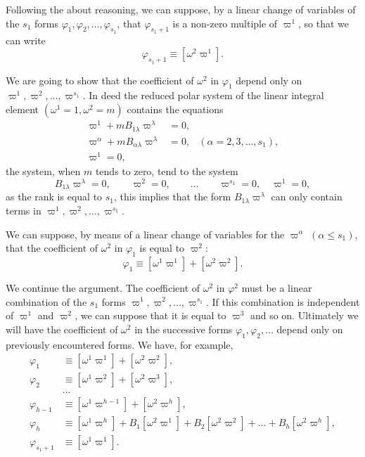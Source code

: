 \vspace{12pt}\fsec Following the about reasoning, we can suppose, by a linear change of variables of the $s_{1}$ forms $\varphi_{1},\varphi_{2},\dots,\varphi_{s_{1}}$, that $\varphi_{s_{1}+1}$ is a non-zero multiple of $\varpi^{1}$, so that we can write
\begin{equation}
  \label{eq:6.8}
  \varphi_{s_{1}+1}\equiv[\omega^{2}\varpi^{1}].
\end{equation}

We are going to show that the coefficient of $\omega^{2}$ in $\varphi_{1}$ depend only on $\varpi^{1},\varpi^{2},\dots,\varpi^{s_{1}}$. In deed the reduced polar system of the linear integral element $(\omega^{1}=1,\omega^{2}=m)$ contains the equations
\begin{align*}
  \varpi^{1}+mB_{1\lambda}\varpi^{\lambda}&=0,\\
  \varpi^{\alpha}+mB_{\alpha\lambda}\varpi^{\lambda}&=0,&(\alpha=2,3,\dots,s_{1}),\\
  \varpi^{1}=0,
\end{align*}
the system, when $m$ tends to zero, tend to the system
\[
B_{1\lambda}\varpi^{\lambda}=0,\qquad\varpi^{2}=0,\qquad\dots\qquad\varpi^{s_{1}}=0,\quad\varpi^{1}=0,
\]
as the rank is equal to $s_{1}$, this implies that the form $B_{1\lambda}\varpi^{\lambda}$ can only contain terms in $\varpi^{1},\varpi^{2},\dots,\varpi^{s_{1}}$.

We can suppose, by means of a linear change of variables for the $\varpi^{\alpha}$ $(\alpha\le s_{1})$, that the coefficient of $\omega^{2}$ in $\varphi_{1}$ is equal to $\varpi^{2}$:
\[
\varphi_{1}\equiv[\omega^{1}\varpi^{1}]+[\omega^{2}\varpi^{2}].
\]

We continue the argument. The coefficient of $\omega^{2}$ in $\varphi^{2}$ must be a linear combination of the $s_{1}$ forms $\varpi^{1},\varpi^{2},\dots,\varpi^{s_{1}}$. If this combination is independent of $\varpi^{1}$ and $\varpi^{2}$, we can suppose that it is equal to $\varpi^{3}$ and so on. Ultimately we will have the coefficient of $\omega^{2}$ in the successive forms $\varphi_{1},\varphi_{2},\dots$ depend only on previously encountered forms. We have, for example,
\begin{align*}
  \varphi_{1}&\equiv[\omega^{1}\varpi^{1}]+[\omega^{2}\varpi^{2}],\\
  \varphi_{2}&\equiv[\omega^{1}\varpi^{2}]+[\omega^{2}\varpi^{3}],\\
  &\dots\\
  \varphi_{h-1}&\equiv[\omega^{1}\varpi^{h-1}]+[\omega^{2}\varpi^{h}],\\
  \varphi_{h}&\equiv[\omega^{1}\varpi^{h}]+B_{1}[\omega^{2}\varpi^{1}]+B_{2}[\omega^{2}\varpi^{2}]+\dots+B_{h}[\omega^{2}\varpi^{h}],\\
  \varphi_{s_{1}+1}&\equiv[\omega^{1}\varpi^{1}].
\end{align*}

